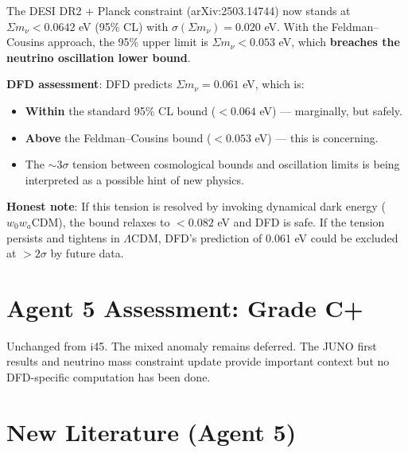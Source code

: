 \documentclass[11pt,a4paper]{article}
\begin{document}
\begin{tcolorbox}[colback=yellow!5!white, colframe=yellow!60!black,
  title={DESI DR2 + Planck: $\Sigma m_\nu < 0.064$ eV Confirmed, Tension Emerging}]

The DESI DR2 + Planck constraint (arXiv:2503.14744) now stands at $\Sigma m_\nu < 0.0642$ eV (95\% CL) with $\sigma(\Sigma m_\nu) = 0.020$ eV. With the Feldman--Cousins approach, the 95\% upper limit is $\Sigma m_\nu < 0.053$ eV, which \textbf{breaches the neutrino oscillation lower bound}.

\textbf{DFD assessment}: DFD predicts $\Sigma m_\nu = 0.061$ eV, which is:
\begin{itemize}
\item \textbf{Within} the standard 95\% CL bound ($< 0.064$ eV) --- marginally, but safely.
\item \textbf{Above} the Feldman--Cousins bound ($< 0.053$ eV) --- this is concerning.
\item The $\sim 3\sigma$ tension between cosmological bounds and oscillation limits is being interpreted as a possible hint of new physics.
\end{itemize}

\textbf{Honest note}: If this tension is resolved by invoking dynamical dark energy ($w_0 w_a$CDM), the bound relaxes to $< 0.082$ eV and DFD is safe. If the tension persists and tightens in $\Lambda$CDM, DFD's prediction of 0.061 eV could be excluded at $> 2\sigma$ by future data.
\end{tcolorbox}

\section{Agent 5 Assessment: Grade C+}

Unchanged from i45. The mixed anomaly remains deferred. The JUNO first results and neutrino mass constraint update provide important context but no DFD-specific computation has been done.

\section{New Literature (Agent 5)}
\end{document}

